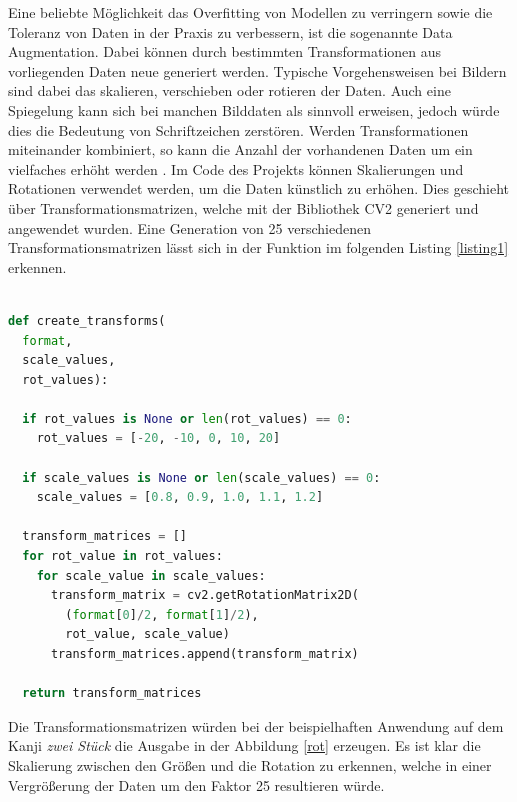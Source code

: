 \documentclass[twoside,a4paper]{IEEEtran}
\begin{document}
Eine beliebte Möglichkeit das Overfitting von Modellen zu verringern sowie die Toleranz von Daten in der Praxis zu verbessern, ist die sogenannte Data Augmentation. Dabei können durch bestimmten Transformationen aus vorliegenden Daten neue generiert werden. Typische Vorgehensweisen bei Bildern sind dabei das skalieren, verschieben oder rotieren der Daten. Auch eine Spiegelung kann sich bei manchen Bilddaten als sinnvoll erweisen, jedoch würde dies die Bedeutung von Schriftzeichen zerstören. Werden Transformationen miteinander kombiniert, so kann die Anzahl der vorhandenen Daten um ein vielfaches erhöht werden \cite[S.311]{MACHINE_LEARNING}. Im Code des Projekts können Skalierungen und Rotationen verwendet werden, um die Daten künstlich zu erhöhen. Dies geschieht über Transformationsmatrizen, welche mit der Bibliothek CV2 generiert und angewendet wurden. Eine Generation von 25 verschiedenen Transformationsmatrizen lässt sich in der Funktion im folgenden Listing \ref{listing1} erkennen.
\begin{lstlisting}[language=python,label=listing1,caption={Python-Code für die Generierung von Transformationsmatrizen}]
	
def create_transforms(
  format, 
  scale_values, 
  rot_values):
  
  if rot_values is None or len(rot_values) == 0:
    rot_values = [-20, -10, 0, 10, 20]
	
  if scale_values is None or len(scale_values) == 0:
    scale_values = [0.8, 0.9, 1.0, 1.1, 1.2]
	
  transform_matrices = []
  for rot_value in rot_values:
    for scale_value in scale_values:
      transform_matrix = cv2.getRotationMatrix2D(
        (format[0]/2, format[1]/2),
        rot_value, scale_value)
      transform_matrices.append(transform_matrix)

  return transform_matrices
\end{lstlisting}
Die Transformationsmatrizen würden bei der beispielhaften Anwendung auf dem Kanji \textit{zwei Stück} die Ausgabe in der Abbildung \ref{rot} erzeugen. Es ist klar die Skalierung zwischen den Größen und die Rotation zu erkennen, welche in einer Vergrößerung der Daten um den Faktor 25 resultieren würde.
\end{document}
